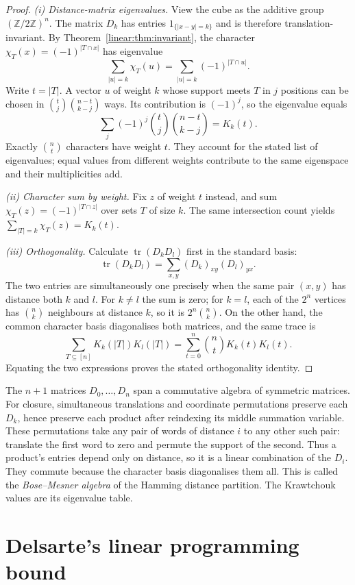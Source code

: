 \begin{proof}
\emph{(i) Distance-matrix eigenvalues.}
View the cube as the additive group
$(\mathbb Z/2\mathbb Z)^n$.
The matrix $D_k$ has entries
$1_{\{|x-y|=k\}}$ and is therefore
translation-invariant. By
Theorem~\ref{linear:thm:invariant},
the character $\chi_T(x)=(-1)^{|T\cap x|}$
has eigenvalue
\[
\sum_{|u|=k}\chi_T(u)
=\sum_{|u|=k}(-1)^{|T\cap u|}.
\]
Write $t=|T|$. A vector $u$ of weight
$k$ whose support meets $T$ in $j$
positions can be chosen in
$\binom tj\binom{n-t}{k-j}$ ways.
Its contribution is $(-1)^j$, so
the eigenvalue equals
\[
\sum_j(-1)^j\binom tj\binom{n-t}{k-j}
=K_k(t).
\]
Exactly $\binom nt$ characters have weight $t$. They account for the stated
list of eigenvalues; equal values from different weights contribute to the
same eigenspace and their multiplicities add.

\emph{(ii) Character sum by weight.}
Fix $z$ of weight $t$ instead, and
sum $\chi_T(z)=(-1)^{|T\cap z|}$
over sets $T$ of size $k$.
The same intersection count yields
$\sum_{|T|=k}\chi_T(z)=K_k(t)$.

\emph{(iii) Orthogonality.}
Calculate $\operatorname{tr}(D_kD_l)$
first in the standard basis:
\[
\operatorname{tr}(D_kD_l)
=\sum_{x,y}(D_k)_{xy}(D_l)_{yx}.
\]
The two entries are simultaneously
one precisely when the same pair
$(x,y)$ has distance both $k$ and
$l$. For $k\ne l$ the sum is zero;
for $k=l$, each of the $2^n$
vertices has $\binom nk$ neighbours
at distance $k$, so it is
$2^n\binom nk$. On the other hand,
the common character basis
diagonalises both matrices, and
the same trace is
\[
\sum_{T\subseteq[n]}K_k(|T|)K_l(|T|)
=\sum_{t=0}^n\binom ntK_k(t)K_l(t).
\]
Equating the two expressions proves
the stated orthogonality identity.
\end{proof}

The $n+1$ matrices $D_0,\dots,D_n$ span a commutative algebra of symmetric
matrices. For closure, simultaneous translations and coordinate permutations
preserve each $D_k$, hence preserve each product after reindexing its middle
summation variable. These permutations take any pair of words of distance $i$
to any other such pair: translate the first word to zero and permute the
support of the second. Thus a product's entries depend only on distance, so
it is a linear combination of the $D_i$. They commute because the character
basis diagonalises them all. This is called the \emph{Bose--Mesner algebra}
of the Hamming distance partition. The Krawtchouk values are its eigenvalue table.

\section{Delsarte's linear programming bound}

